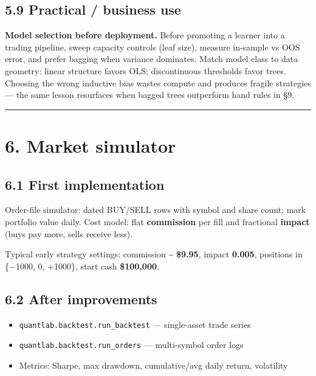 \documentclass[
  11pt,
]{article}
\providecommand{\tightlist}{%
  \setlength{\itemsep}{0pt}\setlength{\parskip}{0pt}}
\begin{document}
\subsection{5.9 Practical / business
use}\label{practical-business-use-3}

\textbf{Model selection before deployment.} Before promoting a learner
into a trading pipeline, sweep capacity controls (leaf size), measure
in-sample vs OOS error, and prefer bagging when variance dominates.
Match model class to data geometry: linear structure favors OLS;
discontinuous thresholds favor trees. Choosing the wrong inductive bias
wastes compute and produces fragile strategies --- the same lesson
resurfaces when bagged trees outperform hand rules in §9.

\begin{center}\rule{0.5\linewidth}{0.5pt}\end{center}

\section{6. Market simulator}\label{market-simulator}

\subsection{6.1 First implementation}\label{first-implementation-1}

Order-file simulator: dated BUY/SELL rows with symbol and share count;
mark portfolio value daily. Cost model: flat \textbf{commission} per
fill and fractional \textbf{impact} (buys pay more, sells receive less).

Typical early strategy settings: commission \textasciitilde{}
\textbf{\$9.95}, impact \textbf{0.005}, positions in \{−1000, 0,
+1000\}, start cash \textbf{\$100,000}.

\subsection{6.2 After improvements}\label{after-improvements-3}

\begin{itemize}
\tightlist
\item
  \texttt{quantlab.backtest.run\_backtest} --- single-asset trade
  series\\
\item
  \texttt{quantlab.backtest.run\_orders} --- multi-symbol order logs\\
\item
  Metrics: Sharpe, max drawdown, cumulative/avg daily return, volatility
\end{itemize}
\end{document}
